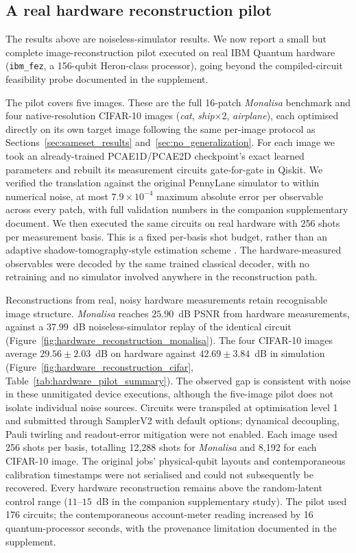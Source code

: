 \documentclass[pdflatex,sn-basic]{sn-jnl}
\begin{document}
\subsection{A real hardware reconstruction pilot}
\label{sec:hardware_pilot}

The results above are noiseless-simulator results. We now report a small but
complete image-reconstruction pilot executed on real IBM Quantum hardware
(\texttt{ibm\_fez}, a 156-qubit Heron-class processor), going beyond the
compiled-circuit feasibility probe documented in the supplement.

The pilot covers five images. These are the full 16-patch \textit{Monalisa}
benchmark and four native-resolution CIFAR-10 images (\textit{cat},
\textit{ship}$\times2$, \textit{airplane}), each optimised directly on its own
target image following the same per-image protocol as Sections~\ref{sec:sameset_results} and~\ref{sec:no_generalization}. For each image we took an already-trained PCAE1D/PCAE2D checkpoint's exact
learned parameters and rebuilt its measurement circuits gate-for-gate in Qiskit.
We verified the translation against the original PennyLane simulator to within
numerical noise, at most $7.9\times10^{-4}$ maximum absolute error per
observable across every patch, with full validation numbers in the companion
supplementary document. We then executed the same circuits on real hardware with
256 shots per measurement basis. This is a fixed per-basis shot budget, rather
than an adaptive shadow-tomography-style estimation scheme
\citep{Huang2020Shadows}. The hardware-measured observables were decoded by the
same trained classical decoder, with no retraining and no simulator involved
anywhere in the reconstruction path.

Reconstructions from real, noisy hardware measurements retain recognisable image
structure. \textit{Monalisa} reaches $25.90$~dB PSNR from hardware measurements,
against a $37.99$~dB noiseless-simulator replay of the identical circuit
(Figure~\ref{fig:hardware_reconstruction_monalisa}). The four CIFAR-10 images
average $29.56\pm2.03$~dB on hardware against $42.69\pm3.84$~dB in simulation
(Figure~\ref{fig:hardware_reconstruction_cifar},
Table~\ref{tab:hardware_pilot_summary}). The observed gap is consistent with
noise in these unmitigated device executions, although the five-image pilot does
not isolate individual noise sources.
Circuits were transpiled at optimisation level 1 and submitted through
SamplerV2 with default options; dynamical decoupling, Pauli twirling and
readout-error mitigation were not enabled. Each image used 256 shots per basis,
totalling 12{,}288 shots for \textit{Monalisa} and 8{,}192 for each CIFAR-10
image. The original jobs' physical-qubit layouts and contemporaneous calibration
timestamps were not serialised and could not subsequently be recovered. Every hardware reconstruction remains above
the random-latent control range ($11$--$15$~dB in the companion supplementary
study). The pilot used 176 circuits; the contemporaneous account-meter reading
increased by 16 quantum-processor seconds, with the provenance limitation
documented in the supplement.
\end{document}
